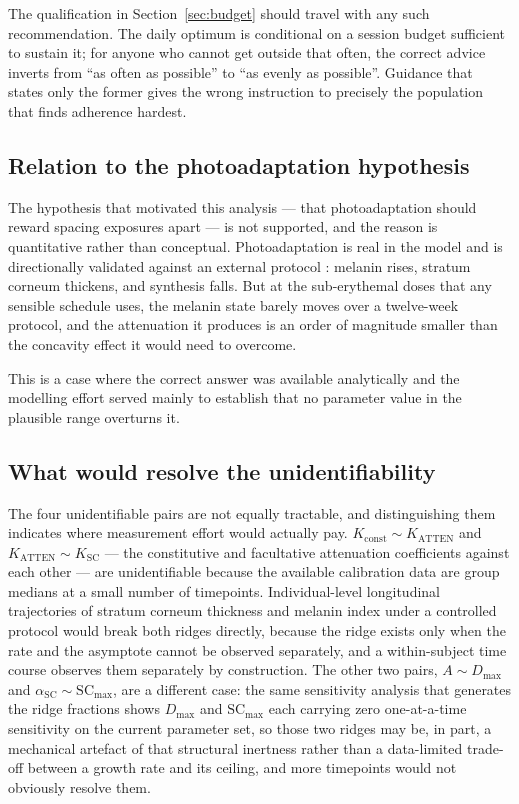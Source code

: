 \documentclass[11pt]{article}
\begin{document}
The qualification in Section~\ref{sec:budget} should travel with any
such recommendation. The daily optimum is conditional on a session
budget sufficient to sustain it; for anyone who cannot get outside
that often, the correct advice inverts from ``as often as possible''
to ``as evenly as possible''. Guidance that states only the former
gives the wrong instruction to precisely the population that finds
adherence hardest.

\subsection{Relation to the photoadaptation hypothesis}

The hypothesis that motivated this analysis --- that photoadaptation
should reward spacing exposures apart --- is not supported, and the
reason is quantitative rather than conceptual. Photoadaptation is real
in the model and is directionally validated against an external
protocol \citep{deboer2025}: melanin rises, stratum corneum thickens,
and synthesis falls. But at the sub-erythemal doses that any sensible
schedule uses, the melanin state barely moves over a twelve-week
protocol, and the attenuation it produces is an order of magnitude
smaller than the concavity effect it would need to overcome.

This is a case where the correct answer was available analytically and
the modelling effort served mainly to establish that no parameter
value in the plausible range overturns it.

\subsection{What would resolve the unidentifiability}

The four unidentifiable pairs are not equally tractable, and
distinguishing them indicates where measurement effort would actually
pay. $K_{\mathrm{const}} \sim K_{\mathrm{ATTEN}}$ and
$K_{\mathrm{ATTEN}} \sim K_{\mathrm{SC}}$ --- the constitutive and
facultative attenuation coefficients against each other --- are
unidentifiable because the available calibration data are group
medians at a small number of timepoints. Individual-level longitudinal
trajectories of stratum corneum thickness and melanin index under a
controlled protocol would break both ridges directly, because the
ridge exists only when the rate and the asymptote cannot be observed
separately, and a within-subject time course observes them separately
by construction. The other two pairs, $A \sim D_{\max}$ and
$\alpha_{\mathrm{SC}} \sim \mathrm{SC}_{\max}$, are a different case:
the same sensitivity analysis that generates the ridge fractions shows
$D_{\max}$ and $\mathrm{SC}_{\max}$ each carrying zero one-at-a-time
sensitivity on the current parameter set, so those two ridges may be,
in part, a mechanical artefact of that structural inertness rather
than a data-limited trade-off between a growth rate and its ceiling,
and more timepoints would not obviously resolve them.
\end{document}
